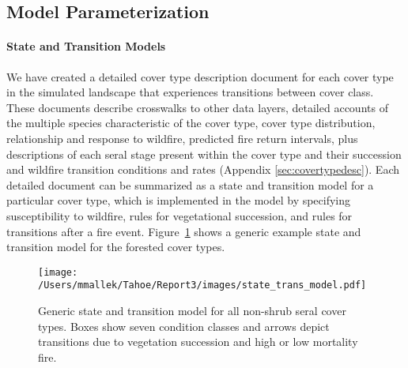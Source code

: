 \subsection{Model Parameterization}
\label{subsec:hrvmodelparam}

\paragraph{State and Transition Models}
We have created a detailed cover type description document for each cover type in the simulated landscape that experiences transitions between cover class. These documents describe crosswalks to other data layers, detailed accounts of the multiple species characteristic of the cover type, cover type distribution, relationship and response to wildfire, predicted fire return intervals, plus descriptions of each seral stage present within the cover type and their succession and wildfire transition conditions and rates (Appendix \ref{sec:covertypedesc}). Each detailed document can be summarized as a state and transition model for a particular cover type, which is implemented in the model by specifying susceptibility to wildfire, rules for vegetational succession, and rules for transitions after a fire event. Figure~\ref{transmodel} shows a generic example state and transition model for the forested cover types.

\begin{figure}[htbp]
\centering
\texttt{[image: /Users/mmallek/Tahoe/Report3/images/state\_trans\_model.pdf]}
\caption{Generic state and transition model for all non-shrub seral cover types. Boxes show seven condition classes and arrows depict transitions due to vegetation succession and high or low mortality fire.} 
\label{transmodel}
\end{figure}

